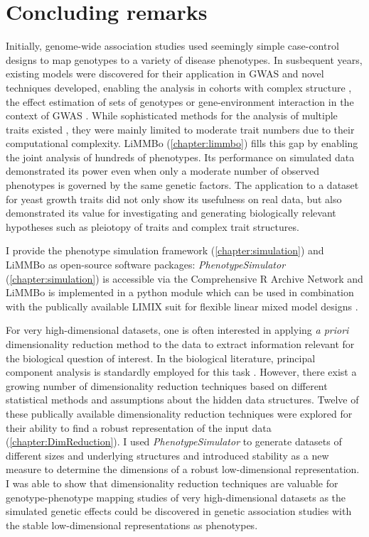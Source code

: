 \chapter{Concluding remarks}
Initially, genome-wide association studies used seemingly simple case-control designs to map genotypes to a variety of disease phenotypes. In susbequent years, existing models were discovered for their application in GWAS \citep{Korte2012} and novel techniques developed, enabling the analysis in cohorts with complex structure \citep{Yu2006,Kang2010}, the effect estimation of sets of genotypes \citep{Wu2010,Casale2015} or gene-environment interaction in the context of GWAS \citep{Casale2017}. While sophisticated methods for the analysis of multiple traits existed \citep{Korte2012,Zhou2012,Casale2015}, they were mainly limited to moderate trait numbers due to their computational complexity. LiMMBo (\cref{chapter:limmbo}) fills this gap by enabling the joint analysis of hundreds of phenotypes.  Its performance on simulated data demonstrated its power even when only a moderate number of observed phenotypes is governed by the same genetic factors. The application to a dataset for yeast growth traits did not only show its usefulness on real data, but also demonstrated its value for investigating and generating biologically relevant hypotheses such as pleiotopy of traits and complex trait structures. 

I provide the phenotype simulation framework (\cref{chapter:simulation}) and LiMMBo as open-source software packages: \textit{PhenotypeSimulator} (\cref{chapter:simulation}) is accessible via the Comprehensive R Archive Network \citep{Meyer2017b} and LiMMBo is implemented in a python module which can be used in combination with the publically available LIMIX suit for flexible linear mixed model designs \citep{Lippert2014}.

For very high-dimensional datasets, one is often interested in applying \textit{a priori} dimensionality reduction method to the data to extract information relevant for the biological question of interest. In the biological literature, principal component analysis is standardly employed for this task \citep{Avery2011,Liu2012,Zhang2012}. However, there exist a growing number of dimensionality reduction techniques based on different statistical methods and assumptions about the hidden data structures. Twelve of these publically available dimensionality reduction techniques were explored for their ability to find a robust representation of the input data (\cref{chapter:DimReduction}). I used \textit{PhenotypeSimulator} to generate datasets of different sizes and underlying structures and introduced stability as a new measure to determine the dimensions of a robust low-dimensional representation. I was able to show that dimensionality reduction techniques are valuable for genotype-phenotype mapping studies of very high-dimensional datasets as the simulated genetic effects could be discovered in genetic association studies with the stable low-dimensional representations as phenotypes.

